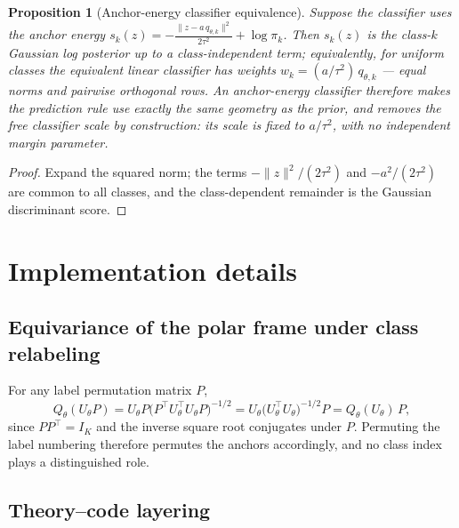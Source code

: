 \documentclass{article}
\theoremstyle{plain}
\newtheorem{proposition}{Proposition}[section]
\theoremstyle{remark}
\begin{document}
\begin{proposition}[Anchor-energy classifier equivalence]
\label{prop:opb-energy}
Suppose the classifier uses the anchor energy
$s_k(z) = -\frac{\|z - a\,q_{\theta,k}\|^2}{2\tau^2} + \log \pi_k$.
Then $s_k(z)$ is the class-$k$ Gaussian log posterior up to a class-independent term;
equivalently, for uniform classes the equivalent linear classifier has weights
$w_k = (a/\tau^2)\,q_{\theta,k}$ --- equal norms and pairwise orthogonal rows. An
anchor-energy classifier therefore makes the prediction rule use exactly the same
geometry as the prior, and removes the free classifier scale by construction: its
scale is fixed to $a/\tau^2$, with no independent margin parameter.
\end{proposition}

\begin{proof}
Expand the squared norm; the terms
$-\|z\|^2/(2\tau^2)$ and $-a^2/(2\tau^2)$ are common to all classes, and the
class-dependent remainder is the Gaussian discriminant score.
\end{proof}

\section{Implementation details}
\label{app:implementation}

\subsection{Equivariance of the polar frame under class relabeling}

For any label permutation matrix $P$,
\begin{equation}
Q_\theta(U_\theta P)
= U_\theta P \bigl( P^{\top} U_\theta^{\top} U_\theta P \bigr)^{-1/2}
= U_\theta \bigl( U_\theta^{\top} U_\theta \bigr)^{-1/2} P
= Q_\theta(U_\theta)\, P ,
\end{equation}
since $P P^{\top} = I_K$ and the inverse square root conjugates under $P$. Permuting
the label numbering therefore permutes the anchors accordingly, and no class index
plays a distinguished role.

\subsection{Theory--code layering}
\end{document}
